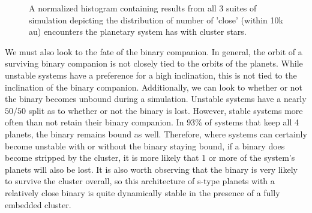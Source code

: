 \documentclass{aastex631}
\begin{document}
\begin{figure}
    \caption{A normalized histogram containing results from all 3 suites of simulation depicting the distribution of 
    number of 'close' (within 10k au) encounters the planetary system has with cluster stars.}
    \label{fig:close_hist}
\end{figure}
We must also look to the fate of the binary companion. In general, the orbit of a surviving binary companion is not 
closely tied to the orbits of the planets. 
While unstable systems have a preference 
for a high inclination, this is not tied to the inclination of the binary companion. Additionally, we can look to whether or not the binary 
becomes unbound during a simulation. Unstable systems have a nearly $50/50$ split as to whether or not the binary is lost. However, stable systems 
more often than not retain their binary companion. In $93\%$ of systems that keep all 4 planets, the binary remains bound as well. Therefore,
where systems can certainly become unstable with or without the binary staying bound, if a binary does become stripped by the cluster, it is more likely
that 1 or more of the system's planets will also be lost. It is also worth observing that the binary is very likely to survive the cluster overall, so this
architecture of s-type planets with a relatively close binary is quite dynamically stable in the presence of a fully embedded cluster.  
\end{document}
